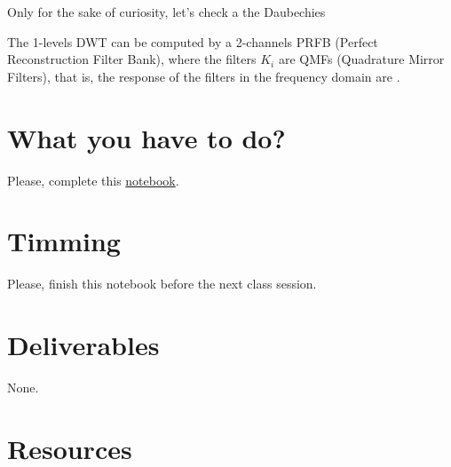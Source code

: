 Only for the sake of curiosity, let's check a the Daubechies 

The 1-levels DWT can be computed by a 2-channels PRFB (Perfect
Reconstruction Filter Bank), where the filters $K_i$ are QMFs
(Quadrature Mirror Filters), that is, the response of the filters in the frequency domain are .

\section{What you have to do?}
  
Please, complete this
\href{https://github.com/Sistemas-Multimedia/Sistemas-Multimedia.github.io/blob/master/study_guide/MDWT/MDWT.ipynb}{notebook}.

\section{Timming}

Please, finish this notebook before the next class session.

\section{Deliverables}

None.

\section{Resources}


